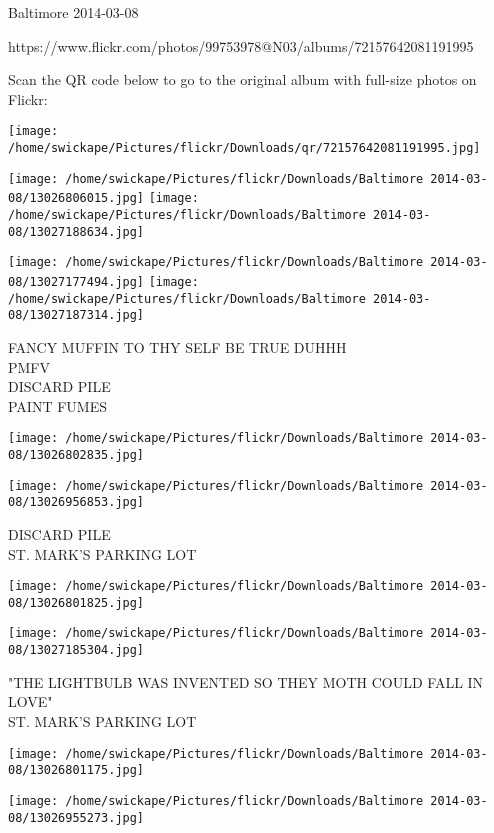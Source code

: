 \documentclass[10pt,letterpaper]{article}
\begin{document}
Baltimore 2014-03-08

https://www.flickr.com/photos/99753978@N03/albums/72157642081191995

Scan the QR code below to go to the original album with full-size photos on Flickr:

\texttt{[image: /home/swickape/Pictures/flickr/Downloads/qr/72157642081191995.jpg]}
\pagebreak

\texttt{[image: /home/swickape/Pictures/flickr/Downloads/Baltimore 2014-03-08/13026806015.jpg]}
\texttt{[image: /home/swickape/Pictures/flickr/Downloads/Baltimore 2014-03-08/13027188634.jpg]}

\texttt{[image: /home/swickape/Pictures/flickr/Downloads/Baltimore 2014-03-08/13027177494.jpg]}
\texttt{[image: /home/swickape/Pictures/flickr/Downloads/Baltimore 2014-03-08/13027187314.jpg]}

FANCY MUFFIN TO THY SELF BE TRUE DUHHH\\
PMFV\\
DISCARD PILE\\
PAINT FUMES\\
\pagebreak

\texttt{[image: /home/swickape/Pictures/flickr/Downloads/Baltimore 2014-03-08/13026802835.jpg]}

\vspace{0.25in}
\texttt{[image: /home/swickape/Pictures/flickr/Downloads/Baltimore 2014-03-08/13026956853.jpg]}

DISCARD PILE\\
ST. MARK'S PARKING LOT\\
\pagebreak

\texttt{[image: /home/swickape/Pictures/flickr/Downloads/Baltimore 2014-03-08/13026801825.jpg]}

\vspace{0.25in}
\texttt{[image: /home/swickape/Pictures/flickr/Downloads/Baltimore 2014-03-08/13027185304.jpg]}

"THE LIGHTBULB WAS INVENTED SO THEY MOTH COULD FALL IN LOVE"\\
ST. MARK'S PARKING LOT\\
\pagebreak

\texttt{[image: /home/swickape/Pictures/flickr/Downloads/Baltimore 2014-03-08/13026801175.jpg]}

\vspace{0.25in}
\texttt{[image: /home/swickape/Pictures/flickr/Downloads/Baltimore 2014-03-08/13026955273.jpg]}
\end{document}
